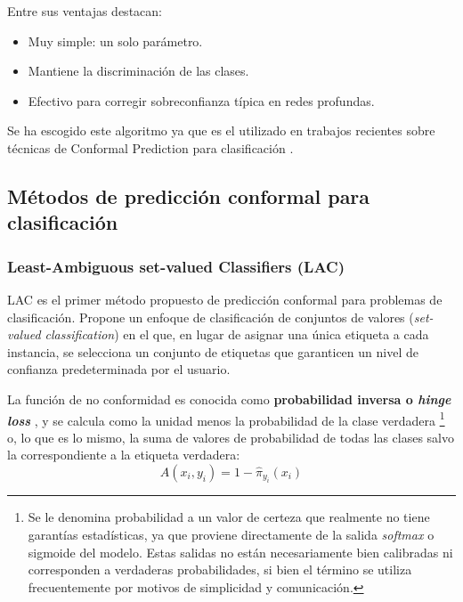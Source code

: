 Entre sus ventajas destacan:
\begin{itemize}
    \item Muy simple: un solo parámetro.
    \item Mantiene la discriminación de las clases.
    \item Efectivo para corregir sobreconfianza típica en redes profundas.
\end{itemize}

Se ha escogido este algoritmo ya que es el utilizado en trabajos recientes sobre técnicas de Conformal Prediction para clasificación \cite{angelopoulos2020, huang2023conformal}.


\subsection{Métodos de predicción conformal para clasificación}

\subsubsection{Least-Ambiguous set-valued Classifiers (LAC)}

\acrshort{LAC} \cite{sadinle2019} es el primer método propuesto de predicción conformal para problemas de clasificación. Propone un enfoque de clasificación de conjuntos de valores (\textit{set-valued classification}) en el que, en lugar de asignar una única etiqueta a cada instancia, se selecciona un conjunto de etiquetas que garanticen un nivel de confianza predeterminada por el usuario.

La función de no conformidad es conocida como \textbf{probabilidad inversa o \textit{hinge loss}} \cite{johansson2017}, y se calcula como la unidad menos la probabilidad de la clase verdadera%
\footnote{
    Se le denomina probabilidad a un valor de certeza que realmente no tiene garantías estadísticas, ya que proviene directamente de la salida \textit{softmax} o sigmoide del modelo. Estas salidas no están necesariamente bien calibradas ni corresponden a verdaderas probabilidades, si bien el término se utiliza frecuentemente por motivos de simplicidad y comunicación.
}
o, lo que es lo mismo, la suma de valores de probabilidad de todas las clases salvo la correspondiente a la etiqueta verdadera:
$$
A(x_i,y_i) = 1- \hat{\pi}_{y_i}(x_i)
$$

